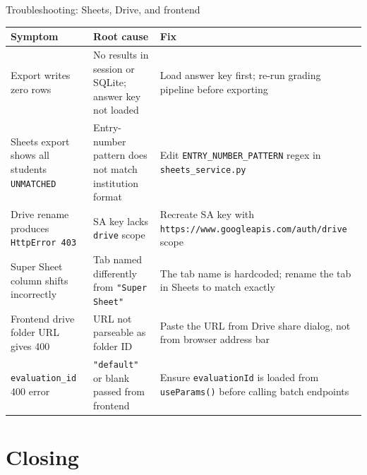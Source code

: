 \documentclass[aspectratio=169]{beamer}
\begin{document}
\begin{frame}{Troubleshooting: Sheets, Drive, and frontend}
  \tiny
  \begin{tabular}{@{}p{4.2cm}p{4.4cm}p{5.1cm}@{}}
    \toprule
    Symptom & Root cause & Fix \\
    \midrule
    Export writes zero rows & No results in session or SQLite; answer key not loaded & Load answer key first; re-run grading pipeline before exporting \\
    Sheets export shows all students \texttt{UNMATCHED} & Entry-number pattern does not match institution format & Edit \texttt{ENTRY\_NUMBER\_PATTERN} regex in \texttt{sheets\_service.py} \\
    Drive rename produces \texttt{HttpError 403} & SA key lacks \texttt{drive} scope & Recreate SA key with \texttt{https://www.googleapis.com/auth/drive} scope \\
    Super Sheet column shifts incorrectly & Tab named differently from \texttt{"Super Sheet"} & The tab name is hardcoded; rename the tab in Sheets to match exactly \\
    Frontend drive folder URL gives 400 & URL not parseable as folder ID & Paste the URL from Drive share dialog, not from browser address bar \\
    \texttt{evaluation\_id} 400 error & \texttt{"default"} or blank passed from frontend & Ensure \texttt{evaluationId} is loaded from \texttt{useParams()} before calling batch endpoints \\
    \bottomrule
  \end{tabular}
\end{frame}

\section{Closing}
\end{document}
